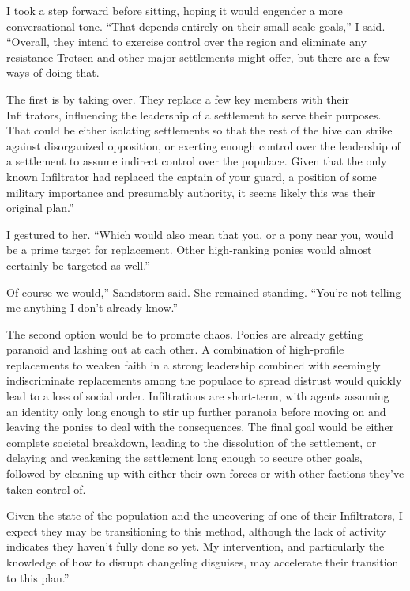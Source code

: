 I took a step forward before sitting, hoping it would engender a more conversational tone. “That depends entirely on their small-scale goals,” I said. “Overall, they intend to exercise control over the region and eliminate any resistance Trotsen and other major settlements might offer, but there are a few ways of doing that.

\leavevmode{}The first is by taking over. They replace a few key members with their Infiltrators, influencing the leadership of a settlement to serve their purposes. That could be either isolating settlements so that the rest of the hive can strike against disorganized opposition, or exerting enough control over the leadership of a settlement to assume indirect control over the populace. Given that the only known Infiltrator had replaced the captain of your guard, a position of some military importance and presumably authority, it seems likely this was their original plan.”

I gestured to her. “Which would also mean that you, or a pony near you, would be a prime target for replacement. Other high-ranking ponies would almost certainly be targeted as well.”

\leavevmode{}Of course we would,” Sandstorm said. She remained standing. “You’re not telling me anything I don’t already know.”

\leavevmode{}The second option would be to promote chaos. Ponies are already getting paranoid and lashing out at each other. A combination of high-profile replacements to weaken faith in a strong leadership combined with seemingly indiscriminate replacements among the populace to spread distrust would quickly lead to a loss of social order. Infiltrations are short-term, with agents assuming an identity only long enough to stir up further paranoia before moving on and leaving the ponies to deal with the consequences. The final goal would be either complete societal breakdown, leading to the dissolution of the settlement, or delaying and weakening the settlement long enough to secure other goals, followed by cleaning up with either their own forces or with other factions they’ve taken control of.

\leavevmode{}Given the state of the population and the uncovering of one of their Infiltrators, I expect they may be transitioning to this method, although the lack of activity indicates they haven’t fully done so yet. My intervention, and particularly the knowledge of how to disrupt changeling disguises, may accelerate their transition to this plan.”

